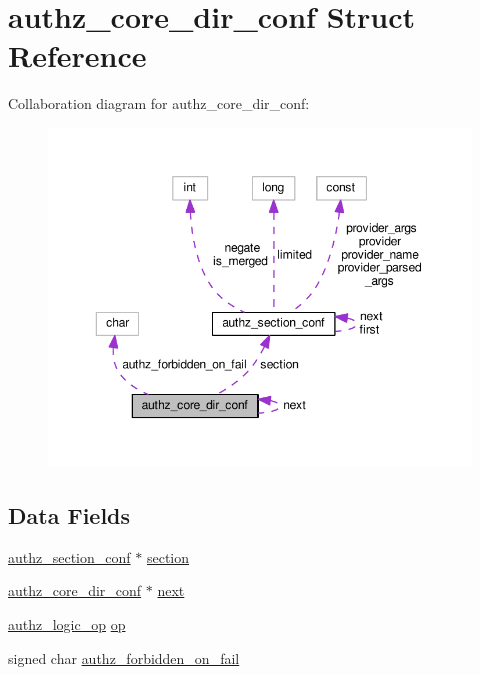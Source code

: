 \hypertarget{structauthz__core__dir__conf}{}\section{authz\+\_\+core\+\_\+dir\+\_\+conf Struct Reference}
\label{structauthz__core__dir__conf}


Collaboration diagram for authz\+\_\+core\+\_\+dir\+\_\+conf\+:
\nopagebreak
\begin{figure}[H]
\begin{center}
\leavevmode
\includegraphics[width=350pt]{structauthz__core__dir__conf__coll__graph}
\end{center}
\end{figure}
\subsection*{Data Fields}
\begin{DoxyCompactItemize}
\item 
\hyperlink{structauthz__section__conf}{authz\+\_\+section\+\_\+conf} $\ast$ \hyperlink{structauthz__core__dir__conf_a2058282c5e8c08a4ad2dc0daadd6ee5f}{section}
\item 
\hyperlink{structauthz__core__dir__conf}{authz\+\_\+core\+\_\+dir\+\_\+conf} $\ast$ \hyperlink{structauthz__core__dir__conf_a2469c2159ce29f5966c7fdf437aa24c1}{next}
\item 
\hyperlink{mod__authz__core_8c_a2f7ea245f9aec9f2a9caee7eced5c767}{authz\+\_\+logic\+\_\+op} \hyperlink{structauthz__core__dir__conf_a89680d56c680114e8d21f0756d7abb66}{op}
\item 
signed char \hyperlink{structauthz__core__dir__conf_ae0399fd05f09ca11dbb6bf0fffca58b8}{authz\+\_\+forbidden\+\_\+on\+\_\+fail}
\end{DoxyCompactItemize}


